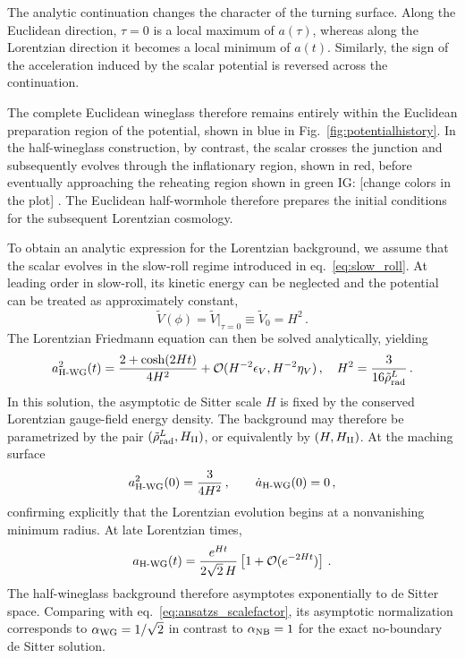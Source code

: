 \documentclass[a4paper,11pt]{article}
\newcommand{\red}[1]{{\color{red} #1 \color{black}}}
\newcommand{\IG}[1]{{\red{IG: #1}}} %
\begin{document}
The analytic continuation changes the character of the turning surface. Along the Euclidean direction, $\tau=0$ is a local maximum of $a(\tau)$, whereas along the Lorentzian direction it becomes a local minimum of $a(t)$. Similarly, the sign of the acceleration induced by the scalar potential is reversed across the continuation.

The complete Euclidean wineglass therefore remains entirely within the Euclidean preparation region of the potential, shown in blue in Fig.~\ref{fig:potentialhistory}. In the half-wineglass construction, by contrast, the scalar crosses the junction and subsequently evolves through the inflationary region, shown in red, before eventually approaching the reheating region shown in green \IG{[change colors in the plot]}. The Euclidean half-wormhole therefore prepares the initial conditions for the subsequent Lorentzian cosmology.


To obtain an analytic expression for the Lorentzian background, we assume that the scalar evolves in the slow-roll regime introduced in eq.~\eqref{eq:slow_roll}. At leading order in slow-roll, its kinetic energy can be neglected and the potential can be treated as approximately constant,
\begin{equation}
    \tilde{V}(\phi) = \tilde{V}\big|_{\tau=0}
    \equiv \tilde{V}_0  =  H^2\,.
\end{equation}
The Lorentzian Friedmann equation can then be solved analytically, yielding
\begin{equation}\label{eq:Lorentzian_wineglass}
    a^2_{\rm H\text{-}WG}(t) = \frac{2+\cosh(2Ht)}{4H^2}+\mathcal{O}(H^{-2}\epsilon_V,H^{-2}\eta_V)\,, \quad H^2 = \frac{3}{16 \tilde{\rho}^L_{\rm rad}}\,.
\end{equation}
In this solution, the asymptotic de Sitter scale $H$ is fixed by the conserved Lorentzian gauge-field energy density. The background may therefore be parametrized by the pair $(\tilde{\rho}_{\rm rad}^{L},H_{\rm II})$, or equivalently by $(H,H_{\rm II})$. At the maching surface
\begin{equation}
     a_{\rm H\text{-}WG}^2(0) = \frac{3}{4H^2}\,,
    \qquad
    \dot a_{\rm H\text{-}WG}(0)=0\,,
\end{equation}
confirming explicitly that the Lorentzian evolution begins at a nonvanishing minimum radius. At late Lorentzian times,
\begin{equation}
    a_{\rm H\text{-}WG}(t) =
    \frac{e^{Ht}}{2\sqrt{2}\,H} \left[ 1+\mathcal{O}(e^{-2Ht}) \right]\,.
\end{equation}
The half-wineglass background therefore asymptotes exponentially to de Sitter space. Comparing with eq.~\eqref{eq:ansatzs_scalefactor}, its asymptotic normalization corresponds to $\alpha_{\rm WG}= 1/\sqrt{2}$ in contrast to $\alpha_{\rm NB}=1$ for the exact no-boundary de Sitter solution.
\end{document}
